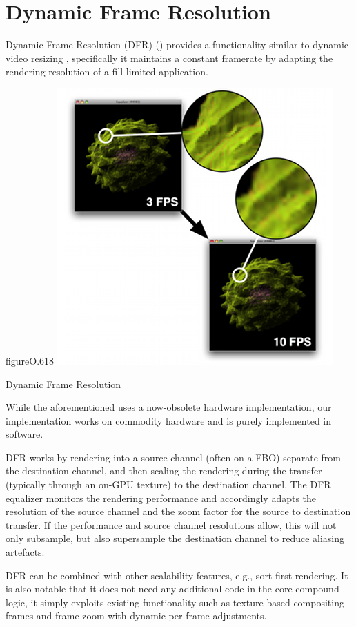 \section{Dynamic Frame Resolution}


Dynamic Frame Resolution (DFR) () provides a functionality similar to
dynamic video resizing \cite{MBDM:97}, specifically it maintains a constant
framerate by adapting the rendering resolution of a fill-limited application.

\begin{wrapfloat}{figure}{O}{.618\textwidth}
  \includegraphics[width=.618\textwidth]{images/dfr}
  \caption{\label{fdfr}Dynamic Frame Resolution}
\end{wrapfloat}

While the aforementioned uses a now-obsolete hardware implementation, our
implementation works on commodity hardware and is purely implemented in
software.

DFR works by rendering into a source channel (often on a FBO) separate from
the destination channel, and then scaling the rendering during the transfer
(typically through an on-GPU texture) to the destination channel. The DFR
equalizer monitors the rendering performance and accordingly adapts the
resolution of the source channel and the zoom factor for the source to
destination transfer. If the performance and source channel resolutions allow,
this will not only subsample, but also supersample the destination channel to
reduce aliasing artefacts.

DFR can be combined with other scalability features, e.g., sort-first
rendering. It is also notable that it does not need any additional code in the
core compound logic, it simply exploits existing functionality such as
texture-based compositing frames and frame zoom with dynamic per-frame
adjustments.

